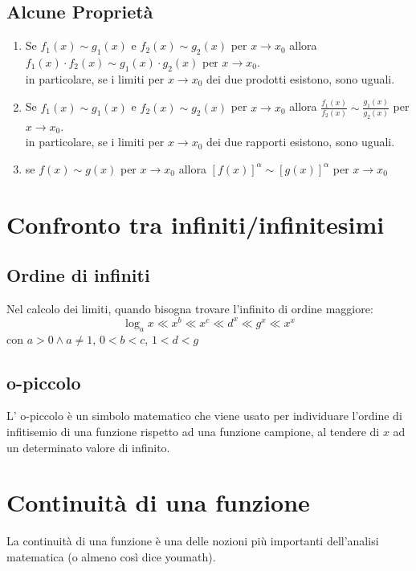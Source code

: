 \documentclass[12pt, a4paper, openany]{book}
\begin{document}
	\subsection*{Alcune Proprietà}
	\begin{enumerate}
		\item Se $f_1(x) \sim g_1(x)$ e $f_2(x) \sim g_2(x)$ per $x \to x_0$ allora $f_1(x) \cdot f_2(x) \sim g_1(x) \cdot g_2(x)$ per $x \to x_0$.
		      \\in particolare, se i limiti per $x \to x_0$ dei due prodotti esistono, sono uguali.
		\item Se $f_1(x) \sim g_1(x)$ e $f_2(x) \sim g_2(x)$ per $x \to x_0$ allora $\frac{f_1(x)}{f_2(x)} \sim \frac{g_1(x)}{g_2(x)}$ per $x \to x_0$.
		      \\in particolare, se i limiti per $x \to x_0$ dei due rapporti esistono, sono uguali.
		\item se $f(x) \sim g(x)$ per $x \to x_0$ allora $[f(x)]^\alpha \sim [g(x)]^\alpha$ per $x \to x_0$
	\end{enumerate}
	\section{Confronto tra infiniti/infinitesimi}
	\subsection*{Ordine di infiniti}
	Nel calcolo dei limiti, quando bisogna trovare l'infinito di ordine maggiore:
	$$ \log_ax\ll x^b\ll x^c\ll d^x\ll g^x\ll x^x $$
	con $a>0 \wedge a\neq 1$, $0<b<c$, $1<d<g$
	\subsection*{o-piccolo}
	L' o-piccolo è un simbolo matematico che viene usato per individuare l'ordine di infitisemio di una funzione rispetto ad una funzione campione,
	al tendere di $x$ ad un determinato valore di infinito.


	\section{Continuità di una funzione}
	La continuità di una funzione è una delle nozioni più importanti dell'analisi matematica (o almeno così dice youmath).
\end{document}
